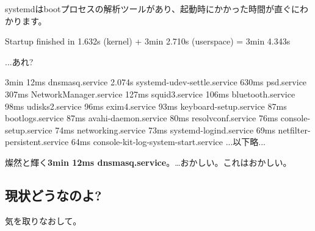 \documentclass[mingoth,a4paper]{jsarticle}
\begin{document}
systemdはbootプロセスの解析ツールがあり、起動時にかかった時間が直ぐにわかります。
\begin{commandline}
Startup finished in 1.632s (kernel) + 3min 2.710s (userspace) = 3min 4.343s
\end{commandline}
...あれ?
\begin{commandline}
       3min 12ms dnsmasq.service
        2.074s systemd-udev-settle.service
         630ms psd.service
         307ms NetworkManager.service
         127ms squid3.service
         106ms bluetooth.service
          98ms udisks2.service
          96ms exim4.service
          93ms keyboard-setup.service
          87ms bootlogs.service
          87ms avahi-daemon.service
          80ms resolvconf.service
          76ms console-setup.service
          74ms networking.service
          73ms systemd-logind.service
          69ms netfilter-persistent.service
          64ms console-kit-log-system-start.service
          ...以下略...
\end{commandline}
燦然と輝く\textbf{3min 12ms dnsmasq.service}。…おかしい。これはおかしい。

\subsection{現状どうなのよ?}

気を取りなおして。
\end{document}

